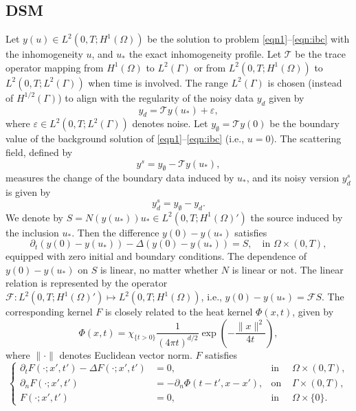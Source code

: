 \documentclass[onefignum,onetabnum]{siamart190516}
\numberwithin{equation}{section}
\begin{document}
\subsection{DSM}
Let $y(u) \in L^{2}(0,T; H^{1}(\Omega))$ be the solution to problem \eqref{eqn1}--\eqref{eqn:ibc} with the inhomogeneity $u$, and $u_{*}$ the exact inhomogeneity profile.
Let $\mathcal{T}$ be the trace operator mapping from $H^{1}(\Omega)$ to $L^{2}(\Gamma)$ or from $L^2(0, T; H^{1}(\Omega))$ to $L^2(0, T;L^{2}(\Gamma))$ when time is involved.
The range $L^{2}(\Gamma)$ is chosen (instead of $H^{1/2}(\Gamma)$) to align with the regularity of the noisy data $y_d$ given by
\begin{equation*}
y_{d} = \mathcal{T}y(u_{*}) + \varepsilon,
\end{equation*}
where $\varepsilon \in L^{2}(0,T; L^{2}(\Gamma))$ denotes noise.
Let $y_{\emptyset} = \mathcal{T}y(0)$ be the boundary value of the background solution of \eqref{eqn1}--\eqref{eqn:ibc} (i.e., $u = 0$).
The scattering field, defined by
\begin{equation*}
y^{s} = y_{\emptyset} - \mathcal{T}y(u_{*}),
\end{equation*}
measures the change of the boundary data induced by $u_*$, and its noisy version $y^{s}_{d}$ is given by
\begin{equation*}
y^{s}_{d} = y_{\emptyset} - y_{d}.
\end{equation*}
We denote by $S = N(y(u_{*}))u_{*} \in L^{2}(0,T; H^{1}(\Omega)')$ the source induced by the inclusion $u_{*}$.
Then the difference $y(0) - y(u_{*})$ satisfies 
\begin{equation}\label{eqn14}
\partial_{t} \left(y(0) - y(u_{*})\right) - \Delta \left(y(0) - y(u_{*})\right) = S, \quad \text{in } \Omega \times (0,T), 
\end{equation}
equipped with zero initial and boundary conditions.
The dependence of $y(0) - y(u_{*})$ on $S$ is linear, no matter whether $N$ is linear or not.
The linear relation is represented by the operator $\mathcal{F}\colon L^{2}(0,T; H^{1}(\Omega)') \mapsto L^{2}(0,T; H^{1}(\Omega))$, i.e., $y(0) - y(u_{*}) = \mathcal{F}S$.
The corresponding kernel $F$ is closely related to the heat kernel $\Phi(x,t)$, given by
\begin{equation*}
\Phi(x,t) = \chi_{\{t > 0\}} \frac{1}{(4\pi t)^{d/2}} \exp\left(-\frac{\|x\|^2}{4t}\right),
\end{equation*}
where $\|\cdot\|$ denotes Euclidean vector norm.
$F$ satisfies 
\begin{equation}\label{eqn22}
\left\{
\begin{aligned}
\partial_{t} F(\cdot; x', t') - \Delta F(\cdot; x', t') &= 0, & \text{in }& \Omega \times (0, T), \\
{\partial_n} F(\cdot; x', t') &= -{\partial_n} \Phi(t - t', x - x'), & \text{on }& \Gamma \times (0, T), \\
F(\cdot; x', t') &= 0, & \text{in }& \Omega \times \{0\}.
\end{aligned}
\right.
\end{equation}
\end{document}
